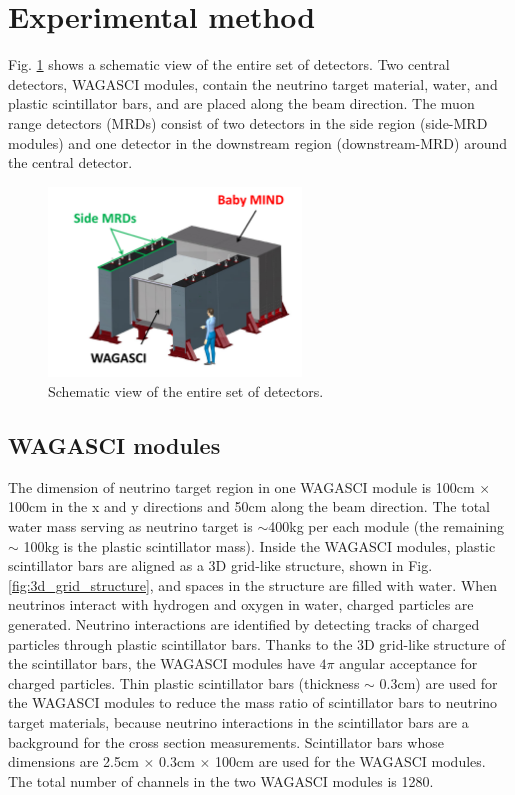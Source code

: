 \section{Experimental method}
Fig. \ref{fig:t59_detectors} shows a schematic view of the entire set of detectors.
Two central detectors, WAGASCI modules, contain the neutrino target material, water, and plastic scintillator bars,
and are placed along the beam direction.
The muon range detectors (MRDs) consist of two detectors in the side region (side-MRD modules)
and one detector in the downstream region (downstream-MRD) around the central detector.

\begin{figure}%
  \begin{center}
  \includegraphics[width=0.6\textwidth]{figs/t59_detectors.pdf}
  \caption{Schematic view of the entire set of detectors.}
  \label{fig:t59_detectors}
  \end{center}
\end{figure}


\subsection{WAGASCI modules}
The dimension of neutrino target region in one WAGASCI module is 
100cm $\times$ 100cm in the x and y directions and 50cm along the beam direction.
The total water mass serving as neutrino target is $\sim$400kg per each module (the remaining $\sim$ 100kg is the plastic scintillator mass).
Inside the WAGASCI modules, plastic scintillator bars are aligned as a 3D grid-like structure,
shown in Fig. \ref{fig:3d_grid_structure}, and spaces in the structure are filled with water.
When neutrinos interact with hydrogen and oxygen in water, charged particles are generated.
Neutrino interactions are identified by detecting tracks of charged particles through plastic scintillator bars.
Thanks to the 3D grid-like structure of the scintillator bars,
the WAGASCI modules have $4\pi$ angular acceptance for charged particles.
Thin plastic scintillator bars (thickness $\sim$ 0.3cm) are used for the WAGASCI modules
to reduce the mass ratio of scintillator bars to neutrino target materials,
because neutrino interactions in the scintillator bars are a background for the cross section measurements.
Scintillator bars whose dimensions are 2.5cm $\times$ 0.3cm $\times$ 100cm are used for the WAGASCI modules.
The total number of channels in the two WAGASCI modules is 1280.

